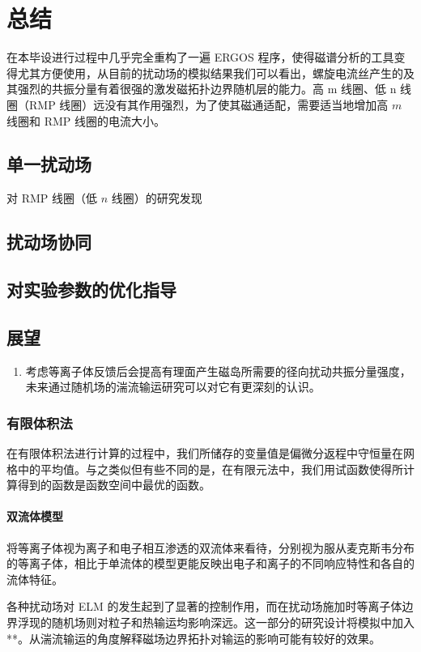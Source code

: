 \chapter{总结}

在本毕设进行过程中几乎完全重构了一遍 ERGOS 程序，使得磁谱分析的工具变得尤其方便使用，从目前的扰动场的模拟结果我们可以看出，螺旋电流丝产生的及其强烈的共振分量有着很强的激发磁拓扑边界随机层的能力。高 m 线圈、低 n 线圈（RMP 线圈）远没有其作用强烈，为了使其磁通适配，需要适当地增加高 $m$ 线圈和 RMP 线圈的电流大小。

\section{单一扰动场}
对 RMP 线圈（低 $n$ 线圈）的研究发现
\section{扰动场协同}
\section{对实验参数的优化指导}

\section{展望}
\begin{enumerate}
    \item 考虑等离子体反馈后会提高有理面产生磁岛所需要的径向扰动共振分量强度，
    未来通过随机场的湍流输运研究可以对它有更深刻的认识。
\end{enumerate}


\subsection{有限体积法}
在有限体积法进行计算的过程中，我们所储存的变量值是偏微分返程中守恒量在网格中的平均值。与之类似但有些不同的是，在有限元法中，我们用试函数使得所计算得到的函数是函数空间中最优的函数。

\subsubsection{双流体模型}
将等离子体视为离子和电子相互渗透的双流体来看待，分别视为服从麦克斯韦分布的等离子体，相比于单流体的模型更能反映出电子和离子的不同响应特性和各自的流体特征。

各种扰动场对 ELM 的发生起到了显著的控制作用，而在扰动场施加时等离子体边界浮现的随机场则对粒子和热输运均影响深远。这一部分的研究设计将模拟中加入**。从湍流输运的角度解释磁场边界拓扑对输运的影响可能有较好的效果。


